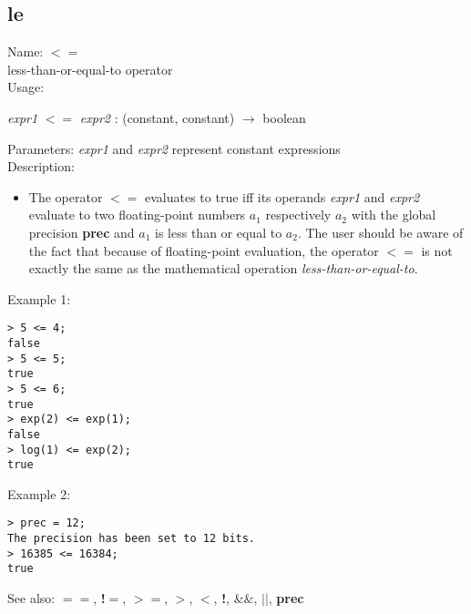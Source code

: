 \subsection{ le }
\noindent Name: \textbf{$<=$}\\
less-than-or-equal-to operator\\

\noindent Usage: 
\begin{center}
\emph{expr1} \textbf{$<=$} \emph{expr2} : (\textsf{constant}, \textsf{constant}) $\rightarrow$ \textsf{boolean}\\
\end{center}
Parameters: 
\emph{expr1} and \emph{expr2} represent constant expressions\\

\noindent Description: \begin{itemize}

\item The operator \textbf{$<=$} evaluates to true iff its operands \emph{expr1} and
   \emph{expr2} evaluate to two floating-point numbers $a_1$
   respectively $a_2$ with the global precision \textbf{prec} and
   $a_1$ is less than or equal to $a_2$. The user should
   be aware of the fact that because of floating-point evaluation, the
   operator \textbf{$<=$} is not exactly the same as the mathematical
   operation \emph{less-than-or-equal-to}.
\end{itemize}
\noindent Example 1: 
\begin{center}\begin{minipage}{14.8cm}\begin{Verbatim}[frame=single]
> 5 <= 4;
false
> 5 <= 5;
true
> 5 <= 6;
true
> exp(2) <= exp(1);
false
> log(1) <= exp(2);
true
\end{Verbatim}
\end{minipage}\end{center}
\noindent Example 2: 
\begin{center}\begin{minipage}{14.8cm}\begin{Verbatim}[frame=single]
> prec = 12;
The precision has been set to 12 bits.
> 16385 <= 16384;
true
\end{Verbatim}
\end{minipage}\end{center}
See also: \textbf{$==$}, \textbf{!$=$}, \textbf{$>=$}, \textbf{$>$}, \textbf{$<$}, \textbf{!}, \textbf{$\&\&$}, \textbf{$||$}, \textbf{prec}
